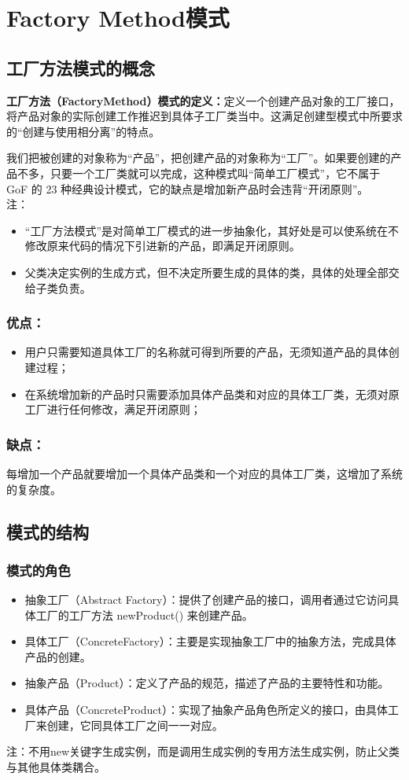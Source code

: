 \chapter{Factory Method模式}
\section{工厂方法模式的概念}
\textbf{工厂方法（FactoryMethod）模式的定义：}定义一个创建产品对象的工厂接口，将产品对象的实际创建工作推迟到具体子工厂类当中。这满足创建型模式中所要求的“创建与使用相分离”的特点。
\par 我们把被创建的对象称为“产品”，把创建产品的对象称为“工厂”。如果要创建的产品不多，只要一个工厂类就可以完成，这种模式叫“简单工厂模式”，它不属于 GoF 的 23 种经典设计模式，它的缺点是增加新产品时会违背“开闭原则”。
\\ 注：
\begin{itemize}
	\item “工厂方法模式”是对简单工厂模式的进一步抽象化，其好处是可以使系统在不修改原来代码的情况下引进新的产品，即满足开闭原则。
	\item 父类决定实例的生成方式，但不决定所要生成的具体的类，具体的处理全部交给子类负责。
\end{itemize}\subsection{优点：}
\begin{itemize}
	\item 用户只需要知道具体工厂的名称就可得到所要的产品，无须知道产品的具体创建过程；
	\item 在系统增加新的产品时只需要添加具体产品类和对应的具体工厂类，无须对原工厂进行任何修改，满足开闭原则；
\end{itemize}
\subsection{缺点：}
每增加一个产品就要增加一个具体产品类和一个对应的具体工厂类，这增加了系统的复杂度。
\section{模式的结构}
\subsection{模式的角色}
\begin{itemize}
	\item 抽象工厂（Abstract Factory）：提供了创建产品的接口，调用者通过它访问具体工厂的工厂方法 newProduct() 来创建产品。
	\item 具体工厂（ConcreteFactory）：主要是实现抽象工厂中的抽象方法，完成具体产品的创建。
	\item 抽象产品（Product）：定义了产品的规范，描述了产品的主要特性和功能。
	\item 具体产品（ConcreteProduct）：实现了抽象产品角色所定义的接口，由具体工厂来创建，它同具体工厂之间一一对应。
\end{itemize}
注：不用new关键字生成实例，而是调用生成实例的专用方法生成实例，防止父类与其他具体类耦合。
